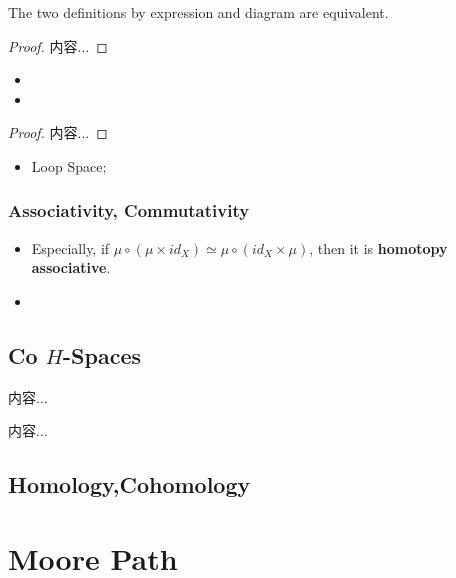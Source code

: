 \documentclass[Total.tex]{subfiles}
\begin{document}
				\begin{proposition}
					The two definitions by expression and diagram are equivalent.
				\end{proposition}
				\begin{proof}
					内容...
				\end{proof}
				
				\begin{proposition}
					\begin{itemize}
						\item 
						\item 
					\end{itemize}
				\end{proposition}
				\begin{proof}
					内容...
				\end{proof}
				\begin{example}
					\begin{itemize}
						\item Loop Space;
					\end{itemize}
				\end{example}
				\subsubsection{Associativity, Commutativity}
				\begin{Def}
					\begin{itemize}
						\item Especially, if $\mu\circ(\mu\times id_X)\simeq \mu\circ (id_X\times\mu)$, then it is \textbf{homotopy associative}.
						\item 
					\end{itemize}
				\end{Def}
			\subsection{Co $H$-Spaces}	
				\begin{Def}
					内容...
				\end{Def}
			
				\begin{example}
					内容...
				\end{example}
				
			\subsection{Homology,Cohomology}
		\section{Moore Path}
\end{document}
